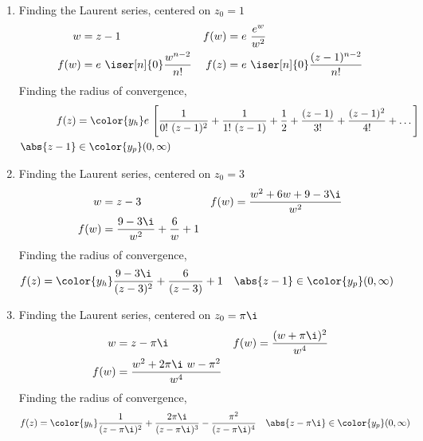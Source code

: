 \begin{enumerate}
    \item Finding the Laurent series, centered on $ z_0 = 1 $
          \begin{align}
              w    & = z - 1                                 &
              f(w) & = e\ \frac{e^w}{w^2}                      \\
              f(w) & = e\ \iser[n]{0} \frac{w^{n - 2}}{n!}   &
              f(z) & = e\ \iser[n]{0} \frac{(z-1)^{n-2}}{n!}
          \end{align}
          Finding the radius of convergence,
          \begin{align}
              f(z)        & = \color{y_h}e\ \Bigg[\frac{1}{0!\ (z-1)^2}
                  + \frac{1}{1!\ (z-1)} + \frac{1}{2} + \frac{(z-1)}{3!}
              + \frac{(z-1)^2}{4!} + \dots \Bigg]                       \\
              \abs{z - 1} & \in \color{y_p} (0, \infty)
          \end{align}

    \item Finding the Laurent series, centered on $ z_0 = 3 $
          \begin{align}
              w    & = z - 3                                 &
              f(w) & = \frac{w^2 + 6w + 9 - 3\i}{w^2}          \\
              f(w) & = \frac{9 - 3\i}{w^2} + \frac{6}{w} + 1
          \end{align}
          Finding the radius of convergence,
          \begin{align}
              f(z)                  & = \color{y_h} \frac{9 - 3\i}{(z-3)^2}
              + \frac{6}{(z-3)} + 1 &
              \abs{z - 1}           & \in \color{y_p} (0, \infty)
          \end{align}

    \item Finding the Laurent series, centered on $ z_0 = \pi\i $
          \begin{align}
              w    & = z - \pi\i                           &
              f(w) & = \frac{(w + \pi\i)^2}{w^4}             \\
              f(w) & = \frac{w^2 + 2\pi\i\ w - \pi^2}{w^4}
          \end{align}
          Finding the radius of convergence,
          \begin{align}
              f(z)            & = \color{y_h} \frac{1}{(z - \pi\i)^2}
              + \frac{2\pi\i}{(z-\pi\i)^3} - \frac{\pi^2}{(z - \pi\i)^4}
                              &
              \abs{z - \pi\i} & \in \color{y_p} (0, \infty)
          \end{align}


\end{enumerate}
